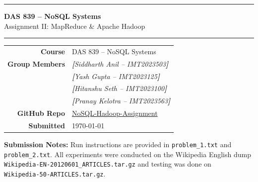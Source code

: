 \documentclass[12pt,a4paper]{article}
\newcommand{\ph}[1]{\textcolor{placeholderborder}{\textit{\textbf{[}#1\textbf{]}}}}
\begin{document}
\begin{titlepage}
  \centering
  \vspace*{1.5cm}

  {\color{primaryblue}\rule{\linewidth}{2pt}}
  \vspace{0.4cm}

  {\Huge\bfseries\color{primaryblue} DAS 839 -- NoSQL Systems}\\[0.6em]
  {\LARGE\color{darkgray} Assignment II: MapReduce \& Apache Hadoop}

  \vspace{0.4cm}
  {\color{primaryblue}\rule{\linewidth}{2pt}}

  \vspace{2.5cm}

  \begin{minipage}{0.75\textwidth}
    \centering
    \large
    \begin{tabular}{rl}
      \textbf{Course}   & DAS 839 -- NoSQL Systems \\[4pt]
      \textbf{Group Members} & \ph{Siddharth Anil -- IMT2023503} \\
                        & \ph{Yash Gupta -- IMT2023125} \\
                        & \ph{Hitanshu Seth -- IMT2023100}\\
                        & \ph{Pranay Kelotra -- IMT2023563} \\[4pt]
      \textbf{GitHub Repo} & \href{https://github.com/sidnovates/NoSQL-Hadoop-Assignment}{NoSQL-Hadoop-Assignment} \\[4pt]
      \textbf{Submitted} & \today \\
    \end{tabular}
  \end{minipage}

  \vfill

  \begin{infobox}
    \textbf{Submission Notes:} Run instructions are provided in \texttt{problem\_1.txt} and \\\texttt{problem\_2.txt}.  All experiments were conducted on the Wikipedia English dump \\\texttt{Wikipedia-EN-20120601\_ARTICLES.tar.gz} and testing was done on \\\texttt{Wikipedia-50-ARTICLES.tar.gz}.
  \end{infobox}

  \vspace{1cm}
\end{titlepage}
\end{document}
